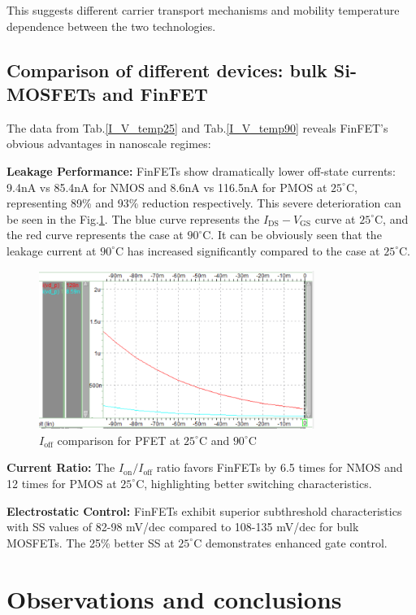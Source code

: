 \documentclass[UTF8,12pt,a4paper]{article}
\begin{document}
This suggests different carrier transport mechanisms and mobility temperature dependence between the two technologies.

\subsection{Comparison of different devices: bulk Si-MOSFETs and FinFET}
The data from Tab.\ref{I_V_temp25} and Tab.\ref{I_V_temp90} reveals FinFET's obvious advantages in nanoscale regimes:

\textbf{Leakage Performance:} FinFETs show dramatically lower off-state currents: 9.4nA vs 85.4nA for NMOS and 8.6nA vs 116.5nA for PMOS at $25^\circ$C, representing 89\% and 93\% reduction respectively. This severe deterioration can be seen in the Fig.\ref{fig:Ioff_comparison}. The blue curve represents the $I_{\text{DS}}-V_{\text{GS}}$ curve at $25^\circ$C, and the red curve represents the case at $90^\circ$C. It can be obviously seen that the leakage current at $90^\circ$C has increased significantly compared to the case at $25^\circ$C.
\begin{figure}[htbp]
    \center
    \includegraphics[width=0.8\textwidth]{figure/wv_FinFET_25_90_off.png}
    \caption{$I_{\text{off}}$ comparison for PFET at $25^\circ$C and $90^\circ$C}
    \label{fig:Ioff_comparison}
\end{figure}

\textbf{Current Ratio:} The $I_{\text{on}}/I_{\text{off}}$ ratio favors FinFETs by 6.5 times for NMOS and 12 times for PMOS at $25^\circ$C, highlighting better switching characteristics.

\textbf{Electrostatic Control:} FinFETs exhibit superior subthreshold characteristics with SS values of 82-98 mV/dec compared to 108-135 mV/dec for bulk MOSFETs. The 25\% better SS at $25^\circ$C demonstrates enhanced gate control.

\newpage
\section{Observations and conclusions}
\end{document}
